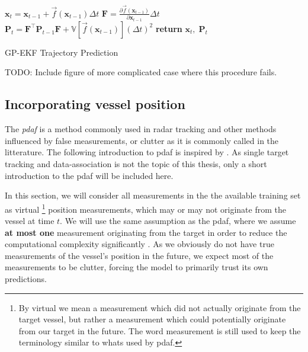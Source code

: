 \begin{algorithm}[h]
    \begin{algorithmic}[1]
        \State $\boldsymbol{x}_{t} = \boldsymbol{x}_{t-1} + \vec{f}(\boldsymbol{x}_{t-1}) \Delta t$
        \State $\boldsymbol{F} = \frac{\partial \vec{f}(\boldsymbol{x}_{t-1})}{\partial \boldsymbol{x}_{t-1}} \Delta t$
        \State $\boldsymbol{P}_t = \boldsymbol{F}^\intercal \boldsymbol{P}_{t-1} \boldsymbol{F} +\mathbb{V}[\vec{f}(\boldsymbol{x}_{t-1})] (\Delta t)^2$
        \State \textbf{return} $\boldsymbol{x}_t, \; \boldsymbol{P}_t$
        \EndProcedure
    \end{algorithmic}
    \caption{GP-EKF Trajectory Prediction}
    \label{alg:gp_ekf_prediction}
\end{algorithm}

TODO: Include figure of more complicated case where this procedure fails.

\subsection{Incorporating vessel position}
The \textit{\acrfull{pdaf}} is a method commonly used in radar tracking and other methods influenced by false measurements, or clutter as it is commonly called in the litterature. The following introduction to \acrshort{pdaf} is inspired by \cite{sensorfusjon}. As single target tracking and data-association is not the topic of this thesis, only a short introduction to the \acrshort{pdaf} will be included here.

In this section, we will consider all measurements in the the available training set as virtual \footnote{By virtual we mean a measurement which did not actually originate from the target vessel, but rather a measurement which could potentially originate from our target in the future. The word measurement is still used to keep the terminology similar to whats used by \acrshort{pdaf}.} position measurements, which may or may not originate from the vessel at time $t$. We will use the same assumption as the \acrshort{pdaf}, where we assume \textbf{at most one} measurement originating from the target in order to reduce the computational complexity significantly \cite{sensorfusjon}. As we obviously do not have true measurements of the vessel's position in the future, we expect most of the measurements to be clutter, forcing the model to primarily trust its own predictions. 

